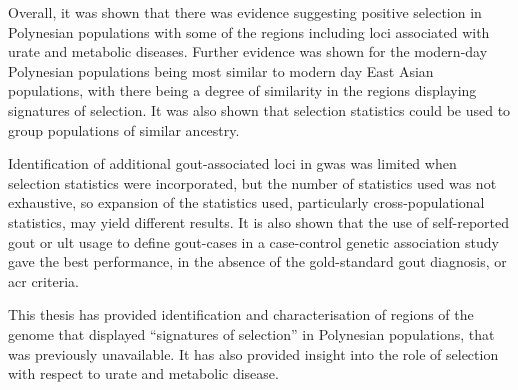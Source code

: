 \documentclass[twoside,openright]{report}
\begin{document}
Overall, it was shown that there was evidence suggesting positive
selection in Polynesian populations with some of the regions including
loci associated with urate and metabolic diseases. Further evidence was
shown for the modern-day Polynesian populations being most similar to
modern day East Asian populations, with there being a degree of
similarity in the regions displaying signatures of selection. It was
also shown that selection statistics could be used to group populations
of similar ancestry.

Identification of additional gout-associated loci in \gls{gwas} was
limited when selection statistics were incorporated, but the number of
statistics used was not exhaustive, so expansion of the statistics used,
particularly cross-populational statistics, may yield different results.
It is also shown that the use of self-reported gout or \gls{ult} usage
to define gout-cases in a case-control genetic association study gave
the best performance, in the absence of the gold-standard gout
diagnosis, or \gls{acr} criteria.

This thesis has provided identification and characterisation of regions
of the genome that displayed ``signatures of selection'' in Polynesian
populations, that was previously unavailable. It has also provided
insight into the role of selection with respect to urate and metabolic
disease.



\end{document}
